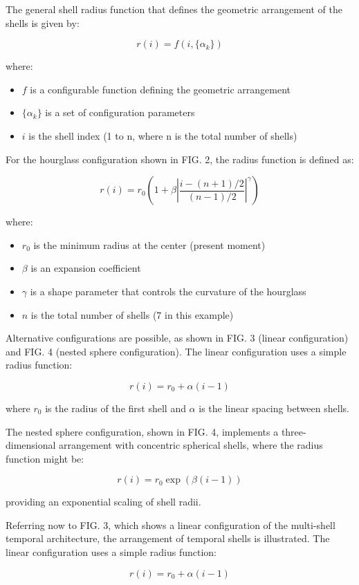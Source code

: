 \documentclass[12pt,letterpaper]{article}
\begin{document}
The general shell radius function that defines the geometric arrangement of the shells is given by:

$$r(i) = f(i, \{\alpha_k\})$$

where:
\begin{itemize}
    \item $f$ is a configurable function defining the geometric arrangement
    \item $\{\alpha_k\}$ is a set of configuration parameters
    \item $i$ is the shell index (1 to n, where n is the total number of shells)
\end{itemize}

For the hourglass configuration shown in FIG. 2, the radius function is defined as:

$$r(i) = r_0 \left(1 + \beta \left|\frac{i - (n+1)/2}{(n-1)/2}\right|^\gamma\right)$$

where:
\begin{itemize}
    \item $r_0$ is the minimum radius at the center (present moment)
    \item $\beta$ is an expansion coefficient
    \item $\gamma$ is a shape parameter that controls the curvature of the hourglass
    \item $n$ is the total number of shells (7 in this example)
\end{itemize}

Alternative configurations are possible, as shown in FIG. 3 (linear configuration) and FIG. 4 (nested sphere configuration). The linear configuration uses a simple radius function:

$$r(i) = r_0 + \alpha (i-1)$$

where $r_0$ is the radius of the first shell and $\alpha$ is the linear spacing between shells.

The nested sphere configuration, shown in FIG. 4, implements a three-dimensional arrangement with concentric spherical shells, where the radius function might be:

$$r(i) = r_0 \exp(\beta (i-1))$$

providing an exponential scaling of shell radii.

Referring now to FIG. 3, which shows a linear configuration of the multi-shell temporal architecture, the arrangement of temporal shells is illustrated. The linear configuration uses a simple radius function:

$$r(i) = r_0 + \alpha (i-1)$$
\end{document}
